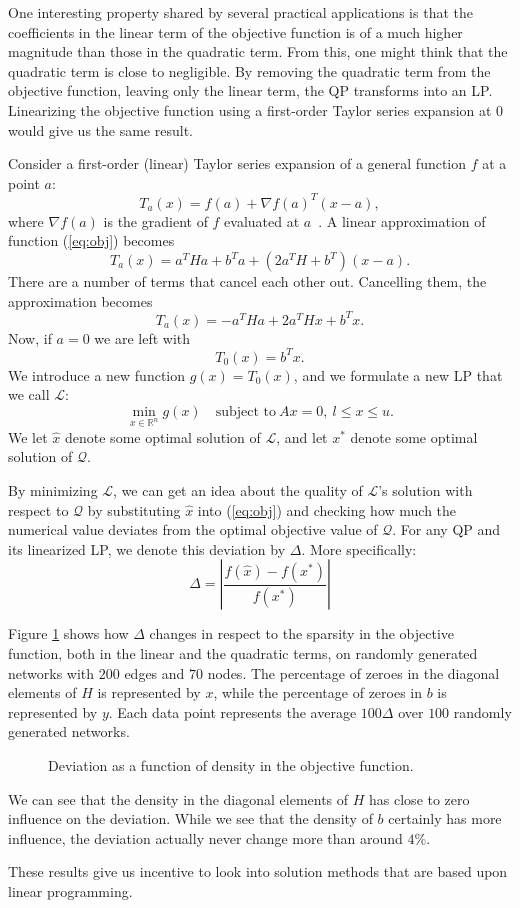 One interesting property shared by several practical applications is that the
coefficients in the linear term of the objective function is of a much higher
magnitude than those in the quadratic term.
From this, one might think that the quadratic term is close to negligible.
By removing the quadratic term from the objective function, leaving only the
linear term, the QP transforms into an LP.
Linearizing the objective function using a first-order Taylor series expansion
at 0 would give us the same result.

Consider a first-order (linear) Taylor series expansion of a
general function $f$ at a point $a$:
\[
T_a(x) = f(a) + \nabla f(a)^T(x-a),
\]
where $\nabla f(a)$ is the gradient of $f$ evaluated at $a$~\cite{apostol}.
A linear approximation of function (\ref{eq:obj}) becomes
\[
T_a(x) = a^THa + b^Ta + (2a^TH + b^T)(x - a).
\]
There are a number of terms that cancel each other out. Cancelling them,
the approximation becomes
\begin{equation}
\label{eq:texp}
T_a(x) = - a^THa + 2a^THx + b^Tx.
\end{equation}
Now, if $a = 0$ we are left with
\[
T_0(x) = b^Tx.
\]
We introduce a new function $g(x) = T_0(x)$, and we formulate a new LP
that we call $\mathcal{L}$:
\[
\min_{x \in \mathbb{R}^n} g(x)
\quad \textrm{subject to}
~
Ax = 0,
~
l \le x \le u.
\]
We let $\hat{x}$ denote some optimal solution of $\mathcal{L}$, and let $x^*$
denote some optimal solution of $\mathcal{Q}$.

By minimizing $\mathcal{L}$, we can get an idea about the quality of
$\mathcal{L}$'s solution with respect to $\mathcal{Q}$ by substituting
$\hat{x}$ into (\ref{eq:obj}) and checking how much the numerical value
deviates from the optimal objective value of $\mathcal{Q}$.
For any QP and its linearized LP, we denote this deviation by $\Delta$.
More specifically:
\[
\Delta = \left|\frac{f(\hat{x}) - f(x^*)}{f(x^*)}\right|
\]

Figure \ref{fig:sparsobj} shows how $\Delta$ changes in respect to the sparsity
in the objective function, both in the linear and the quadratic terms, on
randomly generated networks with $200$ edges and $70$ nodes.
The percentage of zeroes in the diagonal elements of $H$ is represented
by $x$, while the percentage of zeroes in $b$ is represented by $y$.
Each data point represents the average $100\Delta$ over
$100$ randomly generated networks. 

\begin{figure}[ht!]
\begin{center}
    
\end{center}
\caption{Deviation as a function of density in the objective function.}
\label{fig:sparsobj}
\end{figure}

We can see that the density in the diagonal elements of $H$ has
close to zero influence on the deviation.
While we see that the density of $b$ certainly has more influence,
the deviation actually never change more than around $4\%$.

These results give us incentive to look into solution methods that
are based upon linear programming.
